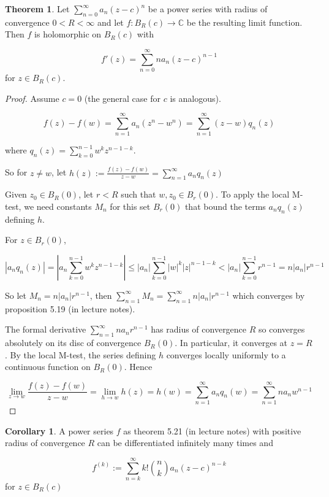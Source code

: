 \documentclass[12pt,a4paper]{article}
\theoremstyle{definition}
\newtheorem{theorem}[definition]{Theorem}
\newtheorem{corollary}[definition]{Corollary}
\begin{document}
\begin{theorem}
	Let $\sum_{n = 0}^{\infty} a_n (z - c)^n$ be a power series with radius of convergence $0 < R < \infty$ and let $f: B_R(c) \rightarrow \mathbb{C}$ be the resulting limit function. Then $f$ is holomorphic on $B_R(c)$ with

	\[f'(z) = \sum_{n = 0}^{\infty} n a_n (z - c)^{n - 1}\] for $z \in B_R(c)$.
\end{theorem}

\begin{proof}
	Assume $c = 0$ (the general case for $c$ is analogous).

	\[f(z) - f(w) = \sum_{n = 1}^{\infty} a_n (z^n - w^n) = \sum_{n = 1}^{\infty} (z - w) q_n(z)\]
	
	where $q_n(z) = \sum_{k = 0}^{n - 1} w^k z^{n - 1 - k}$.

	So for $z \ne w$, let $h(z) := \frac{f(z) - f(w)}{z - w} = \sum_{n = 1}^{\infty} a_n q_n(z)$

	Given $z_0 \in B_R(0)$, let $r < R$ such that $w, z_0 \in B_r(0)$. To apply the local M-test, we need constants $M_n$ for this set $B_r(0)$ that bound the terms $a_n q_n(z)$ defining $h$.

	For $z \in B_r(0)$,

	\[|a_n q_n(z)| = |a_n \sum_{k = 0}^{n - 1} w^k z^{n - 1 - k}| \le |a_n| \sum_{k = 0}^{n - 1} |w|^k |z|^{n - 1 - k} < |a_n| \sum_{k = 0}^{n - 1} r^{n - 1} = n |a_n| r^{n - 1}\]

	So let $M_n = n|a_n| r^{n - 1}$, then $\sum_{n = 1}^{\infty} M_n = \sum_{n = 1}^{\infty} n|a_n| r^{n - 1}$ which converges by proposition 5.19 (in lecture notes).

	The formal derivative $\sum_{n = 1}^{\infty} n a_n r^{n - 1}$ has radius of convergence $R$ so converges absolutely on its disc of convergence $B_R(0)$. In particular, it converges at $z = R$. By the local M-test, the series defining $h$ converges locally uniformly to a continuous function on $B_R(0)$. Hence
	
	\[\lim_{z \rightarrow w} \frac{f(z) - f(w)}{z - w} = \lim_{h \rightarrow w} h(z) = h(w) = \sum_{n = 1}^{\infty} a_n q_n(w) = \sum_{n = 1}^{\infty} n a_n w^{n - 1}\]
\end{proof}

\begin{corollary}
	A power series $f$ as theorem 5.21 (in lecture notes) with positive radius of convergence $R$ can be differentiated infinitely many times and
	
	\[f^{(k)} := \sum_{n = k}^{\infty} k! {n \choose k} a_n {(z - c)}^{n - k}\] for $z \in B_R(c)$
\end{corollary}
\end{document}
